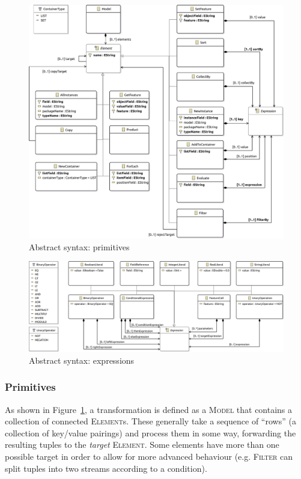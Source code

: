 \documentclass[a4paper]{scrartcl}
\newcommand*{\class}[1]{\textsc{#1}}
\begin{document}
\begin{figure}
  \centering
  \includegraphics[width=\textwidth]{../dsl/eu.ttc.dataflow.model/model/primitives}
  \caption{Abstract syntax: primitives}
  \label{fig:ast-primitives}
\end{figure}

\begin{figure}
  \centering
  \includegraphics[width=\textwidth]{../dsl/eu.ttc.dataflow.model/model/expressions}  
  \caption{Abstract syntax: expressions}
  \label{fig:ast-expressions}
\end{figure}

\subsubsection{Primitives}

As shown in Figure~\ref{fig:ast-primitives}, a transformation is
defined as a \class{Model} that contains a collection of connected
\class{Element}s. These generally take a sequence of ``rows'' (a
collection of key/value pairings) and process them in some way,
forwarding the resulting tuples to the \emph{target}
\class{Element}. Some elements have more than one possible target in
order to allow for more advanced behaviour (e.g. \class{Filter} can
split tuples into two streams according to a condition).
\end{document}
